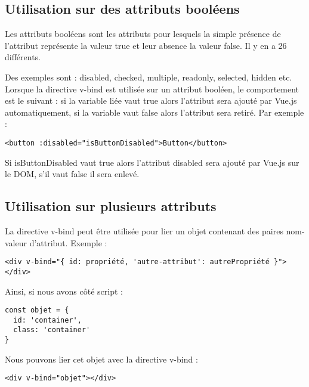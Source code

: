 \subsection{Utilisation sur des attributs booléens}
Les attributs booléens sont les attributs pour lesquels la simple présence de l'attribut représente la valeur true et leur absence la valeur false. Il y en a 26 différents.

Des exemples sont : disabled, checked, multiple, readonly, selected, hidden etc. Lorsque la directive v-bind est utilisée sur un attribut booléen, le comportement est le suivant : si la variable liée vaut true alors l'attribut sera ajouté par Vue.js automatiquement, si la variable vaut false alors l'attribut sera retiré. Par exemple :

\begin{verbatim}
<button :disabled="isButtonDisabled">Button</button>
\end{verbatim}

Si isButtonDisabled vaut true alors l'attribut disabled sera ajouté par Vue.js sur le DOM, s'il vaut false il sera enlevé.

\subsection{Utilisation sur plusieurs attributs}
La directive v-bind peut être utilisée pour lier un objet contenant des paires nom-valeur d'attribut. Exemple :
\begin{verbatim}
<div v-bind="{ id: propriété, 'autre-attribut': autrePropriété }"></div>
\end{verbatim}

Ainsi, si nous avons côté script :
\begin{verbatim}
const objet = {
  id: 'container',
  class: 'container'
}
\end{verbatim}

Nous pouvons lier cet objet avec la directive v-bind :
\begin{verbatim}
<div v-bind="objet"></div>
\end{verbatim}

